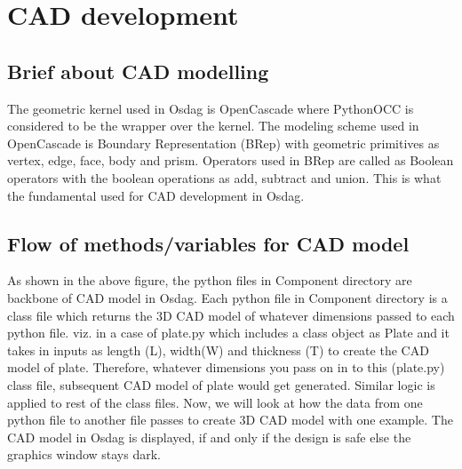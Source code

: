 \chapter{CAD development}
\section{Brief about CAD modelling}
The geometric kernel used in Osdag is OpenCascade where PythonOCC is considered to be the wrapper over the kernel. The modeling scheme used in OpenCascade is Boundary Representation (BRep) with geometric primitives as vertex, edge, face, body and prism. Operators used in BRep are called as Boolean operators with the boolean operations as add, subtract and union. This is what the fundamental used for CAD development in Osdag.

\section{Flow of methods/variables for CAD model}
As shown in the above figure, the python files in Component directory are backbone of CAD model in Osdag. Each python file in Component directory is a class file which returns the 3D CAD model of whatever dimensions passed to each python file.
viz. in a case of plate.py which includes a class object as Plate and it takes in inputs as length (L), width(W) and thickness (T) to create the CAD model of plate. Therefore, whatever dimensions you pass on in to this (plate.py) class file, subsequent CAD model of plate would get generated. Similar logic is applied to rest of the class files.
Now, we will look at how the data from one python file to another file passes to create 3D CAD model with one example.
The CAD model in Osdag is displayed, if and only if the design is safe else the graphics window stays dark.

